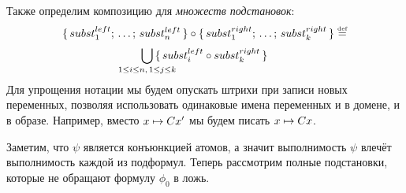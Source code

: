 Также определим композицию для \emph{множеств подстановок}:
\[
    \lbrace \, subst_{1}^{left}; \, \ldots; \,  subst_{n}^{left} \, \rbrace \circ \lbrace \, subst_{1}^{right}; \, \ldots; \,  subst_{k}^{right} \, \rbrace \mathrel{\stackrel{\mbox{\normalfont\tiny def}}{=}}
\]
\[
    \bigcup_{\mathclap{1\leq i \leq n, \, 1
    \leq j \leq k}} \, \setctor{\substname{i}^{left} \circ \substname{k}^{right}}
\]
Для упрощения нотации мы будем опускать штрихи при записи новых переменных, позволяя использовать одинаковые имена переменных и в домене, и в образе. Например, вместо $x \mapsto Cx'$ мы будем писать $x \mapsto Cx$.

Заметим, что $\psi$ является конъюнкцией атомов, а значит выполнимость $\psi$ влечёт выполнимость каждой из подформул. Теперь рассмотрим полные подстановки, которые не обращают формулу $\phi_{0}$ в ложь.

